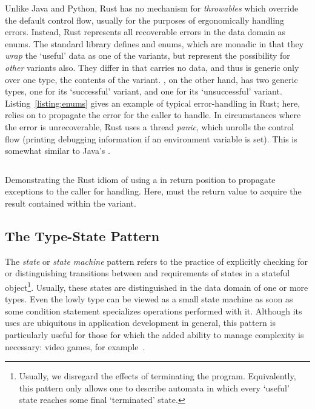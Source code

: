 Unlike Java and Python, Rust has no mechanism for \textit{throwables} which override the default control flow, usually for the purposes of ergonomically handling errors. Instead, Rust represents all recoverable errors in the data domain as enums. The standard library defines  and  enums, which are monadic in that they \textit{wrap} the `useful' data as one of the variants, but represent the possibility for \textit{other} variants also. They differ in that  carries no data, and thus  is generic only over one type, the contents of the  variant. , on the other hand, has two generic types, one for its `successful'  variant, and one for its `unsuccessful'  variant. Listing~\ref{listing:enums} gives an example of typical error-handling in Rust; here,  relies on  to propagate the error for the caller to handle. In circumstances where the error is unrecoverable, Rust uses a thread \textit{panic}, which unrolls the control flow (printing debugging information if an environment variable is set). This is somewhat similar to Java's .

\begin{listing}[ht]
	\centering
	\inputminted[]{rust}{enums.rs}
	\caption[TODO.]{Demonstrating the Rust idiom of using a  in return position to propagate exceptions to the caller for handling. Here,  must  the return value to acquire the result contained within the  variant.}
	\label{listing:enums}
\end{listing}

\subsection{The Type-State Pattern}
\label{sec:type_state}

The \textit{state} or \textit{state machine} pattern refers to the practice of explicitly checking for or distinguishing transitions between and requirements of states in a stateful object\footnote{Usually, we disregard the effects of terminating the program. Equivalently, this pattern only allows one to describe automata in which every `useful' state reaches some final `terminated' state.}. Usually, these states are distinguished in the data domain of one or more types. Even the lowly  type can be viewed as a small state machine as soon as some condition statement specializes operations performed with it. Although its uses are ubiquitous in application development in general, this pattern is particularly useful for those for which the added ability to manage complexity is necessary: video games, for example~\cite{nystrom2014game}.

